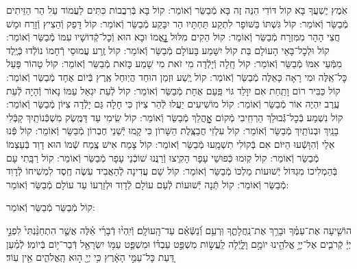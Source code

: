 \documentclass[twoside, openany, parskip=half, 11pt]{book}
\begin{document}
\begin{sometimes}
\begin{small}
אֹֽמֶץ יֶשְׁעֲךָ בָּא קוֹל דּוֹדִי הִנֵּה זֶה בָּא מְֿבַשֵּׂר וְֿאוֹמֵר:
קוֹל בָּא בְּֿרִבֲבוֹת כִּתִּים לַעֲמוֹד עַל הַר הַזֵּיתִים מְֿבַשֵּׂר וְֿאוֹמֵר:
קוֹל גִּשְׁתּוֹ בַּשּׁוֹפָר לִתְקַע תַּחְתָּיו הַר יִבָּקַע מְֿבַשֵּׂר וְֿאוֹמֵר:
קוֹל דָּפַק וְֿהֵצִיץ וְֿזָרַח וּמָשׁ חֲצִי הָהָר מִמִּזְרָח מְֿבַשֵּׂר וְֿאוֹמֵר:
קוֹל הֵקִים מִלּוּל נׇׇׇׇׇׇָאֳמוֹ וּבָא הוּא וְֿכׇל־קְֿדוֹשָׁיו עִמּוֹ מְֿבַשֵּׂר וְֿאוֹמֵר:
קוֹל וּלְכׇל־בָּאֵי הָעוֹלָם בַּת קוֹל יִשָּׁמַע בָּעוֹלָם מְֿבַשֵּׂר וְֿאוֹמֵר:
קוֹל זֶֽרַע עֲמוּסֵי רְֿחָמוֹ נוֹלְֿדוּ כְּֿיֶֽלֶד מִמְּֿעֵי אִמּוֹ מְֿבַשֵּׂר וְֿאוֹמֵר:
קוֹל חָֽלָה וְֿיָלְֿדָה מִי זֹאת מִי שָׁמַע כָּזֹאת מְֿבַשֵּׂר וְֿאוֹמֵר:
קוֹל טָהוֹר פָּעַל כׇּל־אֵֽלֶּה וּמִי רָאָה כָּאֵלֶּה מְֿבַשֵּׂר וְֿאוֹמֵר:
קוֹל יֶֽשַׁע וּזְמַן הוּחַד הֲיֽוּחַל אֶֽרֶץ בְּֿיוֹם אֶחָד מְֿבַשֵּׂר וְֿאוֹמֵר:
קוֹל כַּבִּיר רוֹם וָתַֽחַת אִם יִוָּלֵד גּוֹי פַּֽעַם אֶחָת מְֿבַשֵּׂר וְֿאוֹמֵר:
קוֹל לְֿעֵת יִגְאַל עַמּוֹ נָאוֹר וְֿהָיָה לְֿעֵת עֶֽרֶב יִהְיֶה אוֹר מְֿבַשֵּׂר וְֿאוֹמֵר:
קוֹל מוֹשִׁיעִים יַעֲלוּ לְֿהַר צִיּוֹן כִּי חָלָה גַּם יָלְֿדָה צִיּוֹן מְֿבַשֵּׂר וְֿאוֹמֵר:
קוֹל נִשְׁמַע בְּֿכׇל־גְּֿֿבוּלֵךְ הַרְחִֽיבִי מְֿקוֹם אׇׇׇׇׇׇׇׇׇׇָהֳלֵךְ מְֿבַשֵּׂר וְֿאוֹמֵר:
קוֹל שִֽׂימִי עַד דַּמֶּֽשֶׂק מִשְׁכְּֿנוֹתַֽיִךְ קַבְּֿלִי בָנַֽיִךְ וּבְנוֹתַֽיִךְ מְֿבַשֵּׂר וְֿאוֹמֵר:
קוֹל עִלְזִי חֲבַצֶּֽלֶת הַשָּׁרוֹן כִּי קָֽמוּ יְֿשֵׁנֵי חֶבְרוֹן מְֿבַשֵּׂר וְֿאוֹמֵר:
קוֹל פְּֿנוּ אֵלַי וְֿהִוָּשְֿׁעוּ הַיּוֹם אִם בְּֿקוֹלִי תִשְׁמָֽעוּ מְֿבַשֵּׂר וְֿאוֹמֵר:
קוֹל צָמַח אִישׁ צֶֽמַח שְֿׁמוֹ הוּא דָוִד בְּֿעַצְמוֹ מְֿבַשֵּׂר וְֿאוֹמֵר:
קוֹל קֽוּמוּ כְּֿפוּשֵׁי עָפָר הָקִֽיצוּ וְֿרַנֲּנוּ שׁוֹכְֿנֵי עָפָר מְֿבַשֵּׂר וְֿאוֹמֵר:
קוֹל רַבָּֽתִי עָם בְּֿהַמְלִיכוֹ מִגְדּוֹל יְֿשׁוּעוֹת מַלְכּוֹ מְֿבַשֵּׂר וְֿאוֹמֵר:
קוֹל שֵׁם עֲדִינָה לְֿהַאֲבִיד עֹֽשֶׂה חֶֽסֶד לִמְשִׁיחוֹ לְֿדָוִד מְֿבַשֵּׂר וְֿאוֹמֵר:
קוֹל תְּֿנָה יְֿשׁוּעוֹת לְֿעַם עוֹלָם לְֿדָוִד וּלְזַרְעוֹ עַד עוֹלָם מְֿבַשֵּׂר וְֿאוֹמֵר:

\end{small}

\begin{large}
קוֹל מְֿבַשֵּׂר מְֿבַשֵּׂר וְֿאוֹמֵר:

\end{large}

הוֹשִׁ֤יעָה אֶת־עַמֶּ֗ךָ וּבָרֵ֥ךְ אֶת־נַֽחֲלָתֶ֑ךָ וּֽרְעֵ֥ם וְֿ֝נַשְּֿׂאֵ֗ם עַד־הָֽעוֹלָֽם׃ וְֿיִֽהְי֨וּ דְֿבָרַ֜י אֵ֗לֶּה אֲשֶׁ֤ר הִתְחַנַּ֨נְתִּי֙ לִפְנֵ֣י יְיָ֔ קְֿרֹבִ֛ים אֶל־יְיָ֥ אֱלֹהֵ֖ינוּ יוֹמָ֣ם וָלָ֑יְֿלָה לַֽעֲשׂ֣וֹת מִשְׁפַּ֣ט עַבְדּ֗וֹ וּמִשְׁפַּ֛ט עַמּ֥וֹ יִשְׂרָאֵ֖ל דְּֿבַר־י֥וֹם בְּֿיוֹמֽוֹ׃ לְֿמַ֗עַן דַּ֚עַת כׇּל־עַמֵּ֣י הָאָ֔רֶץ כִּ֥י יְיָ֖ ה֣וּא הָֽאֱלֹהִ֑ים אֵ֖ין עֽוֹד׃



\end{sometimes}
\end{document}
